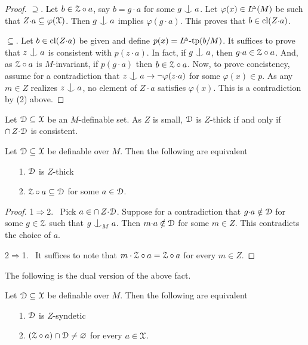 \begin{proof}
  $\supseteq$. 
  Let $b\in\EuScript Z\circ a$, say $b=g{\cdot}a$ for some $g\nonfork a$.
  Let $\varphi(x)\in L\kern-.4ex^{\scriptscriptstyle\Delta}(M)$ be such that $Z{\cdot}a\subseteq\varphi(\EuScript X)$.
  Then $g\nonfork a$ implies $\varphi(g{\cdot}a)$.
  This proves that $b\in{\rm cl}(Z{\cdot}a)$.
  
  $\subseteq$. 
  Let $b\in{\rm cl}(Z{\cdot}a)$ be given and define $p(x)=L\kern-.4ex^{\scriptscriptstyle\Delta}\mbox{-tp}(b/M)$.
  It suffices to prove that $z\nonfork a$ is consistent with $p(z{\cdot}a)$.
  In fact, if $g\nonfork a$, then $g{\cdot}a\in\EuScript Z\circ a$.
  And, as $\EuScript Z\circ a$ is $M$-invariant, if $p(g{\cdot}a)$ then $b\in\EuScript Z\circ a$.
  Now, to prove concistency, assume for a contradiction that $z\nonfork a\rightarrow\neg\varphi(z{\cdot}a)$ for some $\varphi(x)\in p$.
  As any $m\in Z$ realizes $z\nonfork a$, no element of $Z{\cdot}a$ satisfies $\varphi(x)$.
  This is a contradiction by (2) above.
\end{proof}


Let $\EuScript D\subseteq\EuScript X$ be an $M$-definable set.
As $Z$ is small, $\EuScript D$ is $Z$-thick if and only if $\cap\,Z{\cdot}\EuScript D$ is consistent.

\begin{fact}\label{fact_thick_circ}
  Let $\EuScript D\subseteq\EuScript X$ be definable over $M$.
  Then the following are equivalent
  \begin{itemize}
    \item [1.] $\EuScript D$ is $Z$-thick
    \item [2.] $\EuScript Z\circ a\subseteq\EuScript D$ for some $a\in\EuScript D$.
  \end{itemize}
\end{fact}

\begin{proof}
  1$\Rightarrow$2. \ 
  Pick $a\in\cap\,Z{\cdot}\EuScript D$.
  Suppose for a contradiction that $g{\cdot}a\notin\EuScript D$ for some $g\in\EuScript Z$ such that $g\nonfork_M a$.
  Then $m{\cdot}a\notin\EuScript D$ for some $m\in Z$.
  This contradicts the choice of $a$.  

  2$\Rightarrow$1. \ 
  It suffices to note that $m\cdot\EuScript Z\circ a=\EuScript Z\circ a$ for every $m\in Z$.
\end{proof}

The following is the dual version of the above fact.

\begin{fact}
  Let $\EuScript D\subseteq\EuScript X$ be definable over $M$.
  Then the following are equivalent
  \begin{itemize}
    \item [1.] $\EuScript D$ is $Z$-syndetic
    \item [2.] $(\EuScript Z\circ a)\cap\EuScript D\neq\varnothing$ for every $a\in\EuScript X$.
  \end{itemize}
\end{fact}

